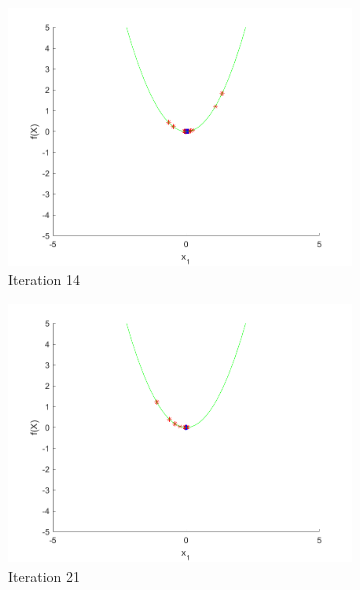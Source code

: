 \begin{figure}
\begin{subfigure}[b]{0.4\textwidth}
    \includegraphics[width=\textwidth]{img/smpl/circ/loa-iter-14}
    \caption{Iteration 14}
    \label{fig:s1-iter-2}
  \end{subfigure}
  \begin{subfigure}[b]{0.4\textwidth}
    \includegraphics[width=\textwidth]{img/smpl/circ/loa-iter-21}
    \caption{Iteration 21}
    \label{fig:s1-iter-3}
  \end{subfigure}
  \begin{subfigure}[b]{0.4\textwidth}

\end{subfigure}
\end{figure}
